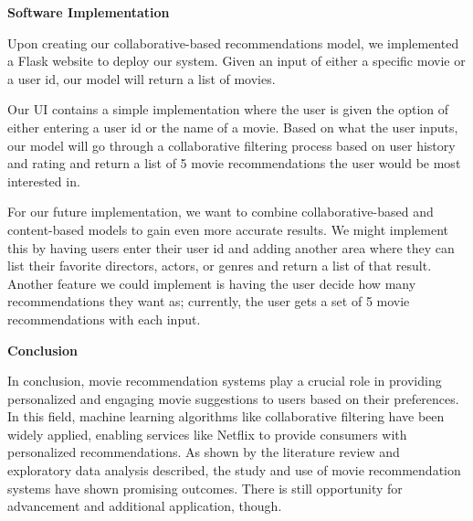 \documentclass[11pt]{article}
\begin{document}
\vspace{1cm}

    \begin{flushleft}
        \textbf{\LARGE Software Implementation}
    \end{flushleft}

\vspace{0.3cm}

Upon creating our collaborative-based recommendations model, we implemented a Flask website to deploy our system. Given an input of either a specific movie or a user id, our model will return a list of movies. 

\vspace{0.3cm}

Our UI contains a simple implementation where the user is given the option of either entering a user id or the name of a movie. Based on what the user inputs, our model will go through a collaborative filtering process based on user history and rating and return a list of 5 movie recommendations the user would be most interested in.

\vspace{0.3cm}

For our future implementation, we want to combine collaborative-based and content-based models to gain even more accurate results. We might implement this by having users enter their user id and adding another area where they can list their favorite directors, actors, or genres and return a list of that result. Another feature we could implement is having the user decide how many recommendations they want as; currently, the user gets a set of 5 movie recommendations with each input.

\vspace{1cm}

    \begin{flushleft}
        \textbf{\LARGE Conclusion}
    \end{flushleft}

In conclusion, movie recommendation systems play a crucial role in providing personalized and engaging movie suggestions to users based on their preferences. In this field, machine learning algorithms like collaborative filtering have been widely applied, enabling services like Netflix to provide consumers with personalized recommendations. As shown by the literature review and exploratory data analysis described, the study and use of movie recommendation systems have shown promising outcomes. There is still opportunity for advancement and additional application, though.
\end{document}
